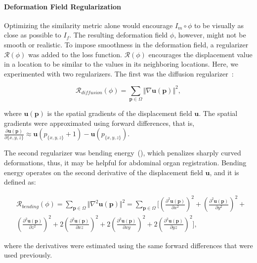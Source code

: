 \documentclass[times,twocolumn,final]{elsarticle}
\begin{document}
\paragraph{Deformation Field Regularization} Optimizing the similarity metric alone would encourage $I_m\circ\phi$ to be visually as close as possible to $I_f$. The resulting deformation field $\phi$, however, might not be smooth or realistic. To impose smoothness in the deformation field, a regularizer $\mathcal{R}(\phi)$ was added to the loss function. $\mathcal{R}(\phi)$ encourages the displacement value in a location to be similar to the values in its neighboring locations. Here, we experimented with two regularizers. The first was the diffusion regularizer~\cite{balakrishnan2019voxelmorph}:
\begin{linenomath}
\begin{equation}
\label{Eqn:diffusion}
\mathcal{R}_{diffusion}(\phi)=\sum_{\mathbf{p}\in\Omega}\Vert\nabla\mathbf{u}(\mathbf{p})\Vert^2,
\end{equation}
\end{linenomath}
where $\mathbf{u}(\mathbf{p})$ is the spatial gradients of the displacement field $\mathbf{u}$. The spatial gradients were approximated using forward differences, that is, $\frac{\partial\mathbf{u}(\mathbf{p})}{\partial\{x,y,z\}}\approx\mathbf{u}(p_{\{x,y,z\}}+1)-\mathbf{u}(p_{\{x,y,z\}})$.

The second regularizer was bending energy~(\cite{rueckert1999nonrigid}), which penalizes sharply curved deformations, thus, it may be helpful for abdominal organ registration. Bending energy operates on the second derivative of the displacement field $\mathbf{u}$, and it is defined as:
\begin{linenomath}
\begin{equation}
\label{eqn:bending}
\begin{split}
    &\mathcal{R}_{bending}(\phi)=\sum_{\mathbf{p}\in\Omega}\Vert\nabla^2\mathbf{u}(\mathbf{p})\Vert^2=\sum_{\mathbf{p}\in\Omega}\Bigg[\left(\frac{\partial^2\mathbf{u}(\mathbf{p})}{\partial x^2}\right)^2+\left(\frac{\partial^2\mathbf{u}(\mathbf{p})}{\partial y^2}\right)^2+\\
    &\left(\frac{\partial^2\mathbf{u}(\mathbf{p})}{\partial z^2}\right)^2+2\left(\frac{\partial^2\mathbf{u}(\mathbf{p})}{\partial xz}\right)^2+2\left(\frac{\partial^2\mathbf{u}(\mathbf{p})}{\partial xy}\right)^2+2\left(\frac{\partial^2\mathbf{u}(\mathbf{p})}{\partial yz}\right)^2\Bigg],
\end{split}
\end{equation}
\end{linenomath}
where the derivatives were estimated using the same forward differences that were used previously.
\end{document}
